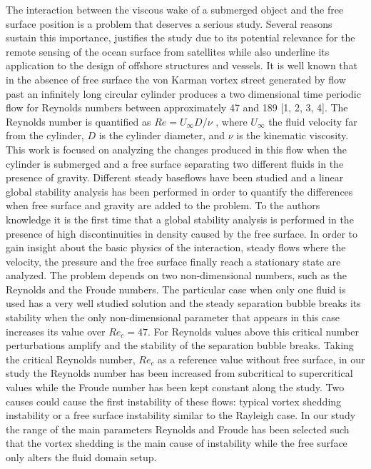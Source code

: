 \documentclass[%
 reprint,
 amsmath,amssymb,
 aps,
prl
]{revtex4-1}
\begin{document}
The interaction between the viscous wake of a submerged object and the free surface position is a problem that deserves a serious study. Several reasons sustain this importance, \cite{Dimas89} justifies the study due to its potential relevance for the remote sensing of the ocean surface from satellites while \cite{Reichl05,Bouscasse15} also underline its application to the design of offshore structures and vessels.
It is well known that in the absence of free surface the von Karman vortex street generated by flow past an infinitely long circular cylinder produces a two dimensional time periodic flow for Reynolds numbers between approximately 47 and 189 [1, 2, 3, 4]. The Reynolds number is quantified as $Re= U_\infty D/\nu$ , where $U_\infty$ the fluid velocity far from the cylinder, $D$ is the cylinder diameter, and $\nu$ is the kinematic viscosity. This work is focused on analyzing the changes produced in this flow when the cylinder is submerged and a free surface separating two different fluids in the presence of gravity. Different steady baseflows have been studied and a linear global stability analysis has been performed in order to quantify the differences when free surface and gravity are added to the problem. To the authors knowledge it is the first time that a global stability analysis is performed in the presence of high discontinuities in density caused by the free surface. In order to gain insight about the basic physics of the interaction, steady flows where the velocity, the pressure and the free surface finally reach a stationary state are analyzed. The problem depends on two non-dimensional numbers, such as the Reynolds and the Froude numbers. The particular case when only one fluid is used has a very well studied solution and the steady separation bubble breaks its stability when the only non-dimensional parameter that appears in this case increases its value over $Re_c=47$. For Reynolds values above this critical number perturbations amplify and the stability of the separation bubble breaks. Taking the critical Reynolds number, $Re_c$ as a reference value without free surface, in our study the Reynolds number has been increased from subcritical to supercritical values  while the Froude number has been kept constant along the study. Two causes could cause the first instability of these flows: typical vortex shedding instability or a free surface instability similar to the Rayleigh case. In our study the range of the main parameters Reynolds and Froude has been selected such that the vortex shedding is the main cause of instability while the free surface only alters the fluid domain setup.
\end{document}
